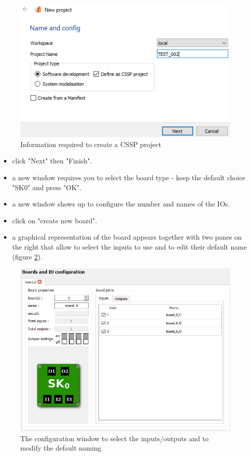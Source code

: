 \begin{figure}[ht]
\centering\includegraphics[scale=0.4]{Pictures/chapterProgramming/FIRSTRUN-create-project-001.png}
\caption{Information required to create a CSSP project}
\label{install:create-project}
\end{figure}

\begin{itemize}    
    \item click "Next" then "Finish".
    \item a new window requires you to select the board type - keep the default choice "SK0" and press "OK".
    \item a new window shows up to configure the number and names of the IOs.
    \item click on "create new board".
    \item a graphical representation of the board appears together with two panes on the right that allow to select the inputs to use and to edit their default name (figure \ref{install:configure-board}).
\end{itemize}
  
  \begin{figure}[h]
\centering\includegraphics[scale=0.3]{Pictures/chapterProgramming/FIRSTRUN-create-project-004.png}
\caption{The configuration window to select the inputs/outputs and to modify the default naming}
\label{install:configure-board}
\end{figure}  
    
